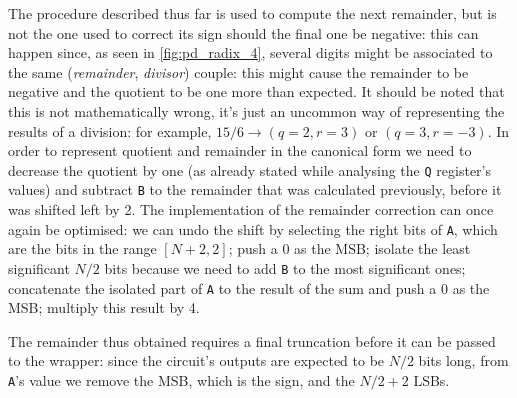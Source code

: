 The procedure described thus far is used to compute the next remainder, but is not the one used to correct its sign should the final one be negative: this can happen since, as seen in \autoref{fig:pd_radix_4}, several digits might be associated to the same (\textit{remainder}, \textit{divisor}) couple: this might cause the remainder to be negative and the quotient to be one more than expected.
It should be noted that this is not mathematically wrong, it's just an uncommon way of representing the results of a division: for example, $15 / 6 \rightarrow (q = 2, r = 3)$ or $(q = 3, r = -3)$.
In order to represent quotient and remainder in the canonical form we need to decrease the quotient by one (as already stated while analysing the \texttt{Q} register's values) and subtract \texttt{B} to the remainder that was calculated previously, before it was shifted left by 2.
The implementation of the remainder correction can once again be optimised: we can undo the shift by selecting the right bits of \texttt{A}, which are the bits in the range $ [N + 2, 2]$; push a 0 as the MSB; isolate the least significant $N/2$ bits because we need to add \texttt{B} to the most significant ones; concatenate the isolated part of \texttt{A} to the result of the sum and push a 0 as the MSB; multiply this result by 4.

The remainder thus obtained requires a final truncation before it can be passed to the wrapper: since the circuit's outputs are expected to be $N/2$ bits long, from \texttt{A}'s value we remove the MSB, which is the sign, and the $N/2 + 2$ LSBs.

